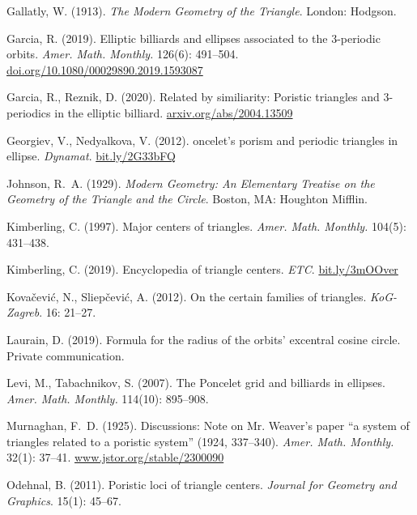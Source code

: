 \documentclass{article}
\theoremstyle{definition}
\begin{document}
\begin{thebibliography}{10}
Gallatly, W. (1913).
\newblock \emph{The Modern Geometry of the Triangle}.
\newblock London: Hodgson.

Garcia, R. (2019).
\newblock Elliptic billiards and ellipses associated to the 3-periodic orbits.
\newblock \emph{Amer. Math. Monthly.} 126(6): 491--504.
\newblock \url{doi.org/10.1080/00029890.2019.1593087}

Garcia, R., Reznik, D. (2020).
\newblock Related by similiarity: Poristic triangles and 3-periodics in the
  elliptic billiard.
\newblock \url{arxiv.org/abs/2004.13509}

Georgiev, V., Nedyalkova, V. (2012).
oncelet’s porism and periodic triangles in ellipse.
\newblock \emph{Dynamat}.
\newblock \url{bit.ly/2G33bFQ}

Johnson, R.~A. (1929).
\newblock \emph{Modern Geometry: An Elementary Treatise on the Geometry of the
  Triangle and the Circle}.
\newblock Boston, MA: Houghton Mifflin.

Kimberling, C. (1997).
\newblock Major centers of triangles.
\newblock \emph{Amer. Math. Monthly.} 104(5): 431--438.

Kimberling, C. (2019).
\newblock Encyclopedia of triangle centers.
\newblock \emph{ETC}.
\newblock \url{bit.ly/3mOOver}

Kova\v{c}evi\'c, N., Sliep\v{c}evi\'c, A. (2012).
\newblock On the certain families of triangles.
\newblock \emph{KoG-Zagreb}. 16: 21--27.

Laurain, D. (2019).
\newblock Formula for the radius of the orbits' excentral cosine circle.
\newblock Private communication.

Levi, M., Tabachnikov, S. (2007).
\newblock The {P}oncelet grid and billiards in ellipses.
\newblock \emph{Amer. Math. Monthly.} 114(10): 895--908.

Murnaghan, F.~D. (1925).
\newblock Discussions: Note on {Mr. Weaver}'s paper ``a system of triangles
  related to a poristic system'' (1924, 337--340).
\newblock \emph{Amer. Math. Monthly.} 32(1): 37--41.
\newblock \url{www.jstor.org/stable/2300090}

Odehnal, B. (2011).
\newblock Poristic loci of triangle centers.
\newblock \emph{Journal for Geometry and Graphics}. 15(1): 45--67.


\end{thebibliography}
\end{document}
